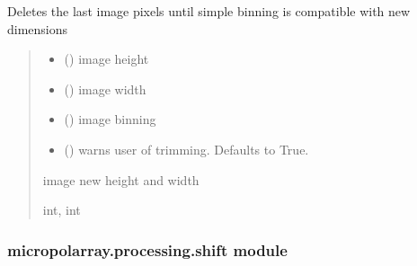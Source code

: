 \documentclass[letterpaper,10pt,english]{sphinxmanual}
\begin{document}
\begin{fulllineitems}
\label{\detokenize{micropolarray.processing:micropolarray.processing.rebin.trim_to_match_binning}}
\pysigstartsignatures
{}
\pysigstopsignatures
\sphinxAtStartPar
Deletes the last image pixels until simple binning is compatible with new dimensions
\begin{quote}\begin{description}
\begin{itemize}
\item {} 
\sphinxAtStartPar
{} () \textendash{} image height

\item {} 
\sphinxAtStartPar
{} () \textendash{} image width

\item {} 
\sphinxAtStartPar
{} () \textendash{} image binning

\item {} 
\sphinxAtStartPar
{} (\sphinxstyleliteralemphasis{\sphinxupquote{, }}) \textendash{} warns user of trimming. Defaults to True.

\end{itemize}

\sphinxAtStartPar
image new height and width

\sphinxAtStartPar
int, int

\end{description}\end{quote}

\end{fulllineitems}



\subsubsection{micropolarray.processing.shift module}
\label{\detokenize{micropolarray.processing:module-micropolarray.processing.shift}}\label{\detokenize{micropolarray.processing:micropolarray-processing-shift-module}}
\end{document}
